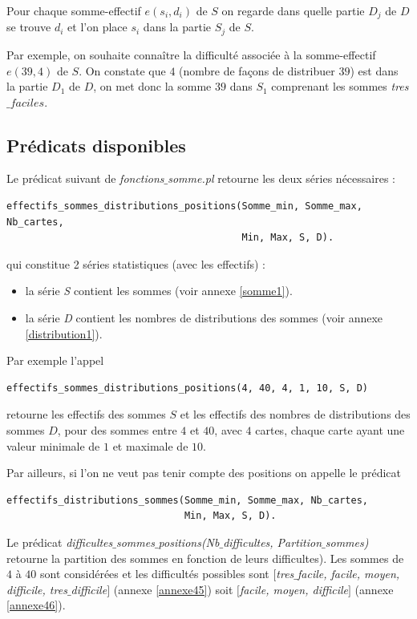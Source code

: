 \documentclass[a4paper, 12]{article}
\begin{document}
Pour chaque somme-effectif $e(s_i, d_i)$ de $S$ on regarde dans quelle partie $D_j$ de $D$ se trouve $d_i$ et l'on place $s_i$ dans la partie $S_j$ de $S$. 

Par exemple, on souhaite connaître la difficulté associée à la somme-effectif $e(39, 4)$ de $S$. On constate que $4$ (nombre de façons de distribuer $39$) est dans la partie $D_1$ de $D$, on met donc la somme $39$ dans $S_1$ comprenant les sommes \emph{tres$\_faciles$}.


\subsection{Prédicats disponibles}

Le prédicat suivant  de \emph{fonctions$\_$somme.pl} retourne les deux séries nécessaires :
\begin{verbatim}
effectifs_sommes_distributions_positions(Somme_min, Somme_max, Nb_cartes, 
                                         Min, Max, S, D).
\end{verbatim}
qui constitue 2 séries statistiques (avec les  effectifs) :
\begin{itemize}
\item la série \emph{S} contient les sommes  (voir annexe \ref{somme1}).
	  
\item la série \emph{D}  contient les nombres de distributions des sommes (voir annexe \ref{distribution1}).
\end{itemize}
Par exemple l'appel 
\begin{verbatim}
effectifs_sommes_distributions_positions(4, 40, 4, 1, 10, S, D)
\end{verbatim}
retourne les effectifs des sommes $S$ et les effectifs des nombres de distributions des sommes $D$, pour des sommes entre $4$ et $40$, avec $4$ cartes, chaque carte ayant une valeur minimale de $1$ 
et maximale de $10$.

Par ailleurs, si l’on ne veut pas tenir compte des positions on appelle le prédicat 
\begin{verbatim}
effectifs_distributions_sommes(Somme_min, Somme_max, Nb_cartes, 
                               Min, Max, S, D).
\end{verbatim}


Le prédicat \emph{difficultes$\_$sommes$\_$positions(Nb$\_$difficultes, Partition$\_$sommes)} retourne la partition des sommes en fonction de leurs difficultes). Les sommes de $4$ à $40$ sont considérées et les difficultés possibles sont \emph{$[$tres$\_$facile, facile, moyen, difficile, tres$\_$difficile$]$}  (annexe \ref{annexe45}) soit \emph{$[$facile, moyen, difficile$]$} (annexe \ref{annexe46}).
\end{document}
